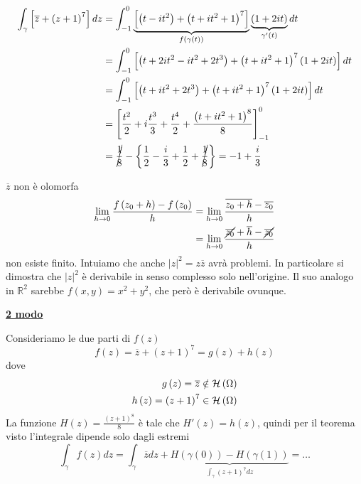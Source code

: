 \begin{align*}
\int\nolimits _{\gamma }\left[\overline{z} +\left( z+1\right)^{7}\right] dz & =\int\nolimits ^{0}_{-1}\underbrace{\left[\left( t-it^{2}\right) +\left( t+it^{2} +1\right)^{7}\right]}_{f\left( \gamma \left( t\right)\right)}\underbrace{\left( 1+2it\right)}_{\gamma '\left( t\right)} dt\\
 & =\int\nolimits ^{0}_{-1}\left[\left( t+2it^{2} -it^{2} +2t^{3}\right) +\left( t+it^{2} +1\right)^{7}\left( 1+2it\right)\right] dt\\
 & =\int\nolimits ^{0}_{-1}\left[\left( t+it^{2} +2t^{3}\right) +\left( t+it^{2} +1\right)^{7}\left( 1+2it\right)\right] dt\\
 & =\left[\frac{t^{2}}{2} +i\frac{t^{3}}{3} +\frac{t^{4}}{2} +\frac{\left( t+it^{2} +1\right)^{8}}{8}\right]^{0}_{-1}\\
 & =\cancel{\frac{1}{8}} -\left\{\frac{1}{2} -\frac{i}{3} +\frac{1}{2} +\cancel{\frac{1}{8}}\right\} =-1+\frac{i}{3}
\end{align*}
\begin{rem}
$\overline{z}$ non è olomorfa
\begin{align*}
\lim\limits _{h\rightarrow 0}\frac{f\left( z_{0} +h\right) -f\left( z_{0}\right)}{h} & =\lim\limits _{h\rightarrow 0}\frac{\overline{z_{0} +h} -\overline{z_{0}}}{h}\\
 & =\lim\limits _{h\rightarrow 0}\frac{\cancel{\overline{z_{0}}} +\overline{h} -\cancel{\overline{z_{0}}}}{h}
\end{align*}
non esiste finito. Intuiamo che anche $\left| z\right| ^{2} =z\overline{z}$ avrà problemi. In particolare si dimostra che $\left| z\right| ^{2}$ è derivabile in senso complesso solo nell'origine. Il suo analogo in $\mathbb{R}^{2}$ sarebbe $f\left( x,y\right) =x^{2} +y^{2}$, che però è derivabile ovunque.
\end{rem}
\textbf{\underline{2 modo}}

Consideriamo le due parti di $f\left( z\right)$
\begin{equation*}
f\left( z\right) =\overline{z} +\left( z+1\right)^{7} =g\left( z\right) +h\left( z\right)
\end{equation*}
dove
\begin{equation*}
\begin{aligned}
g\left( z\right) =\overline{z} & \notin \mathcal{H} \left( \Omega \right)\\
h\left( z\right) =\left( z+1\right)^{7} & \in \mathcal{H} \left( \Omega \right)
\end{aligned}
\end{equation*}
La funzione $H\left( z\right) =\frac{\left( z+1\right)^{8}}{8}$ è tale che $H'\left( z\right) =h\left( z\right)$, quindi per il teorema visto l'integrale dipende solo dagli estremi
\begin{equation*}
\int\nolimits _{\gamma } f\left( z\right) dz=\int\nolimits _{\gamma }\overline{z} dz+\underbrace{H\left( \gamma \left( 0\right)\right) -H\left( \gamma \left( 1\right)\right)}_{\int\nolimits _{\gamma }\left( z+1\right)^{7} dz} =\dotsc 
\end{equation*}
\Soluzione

